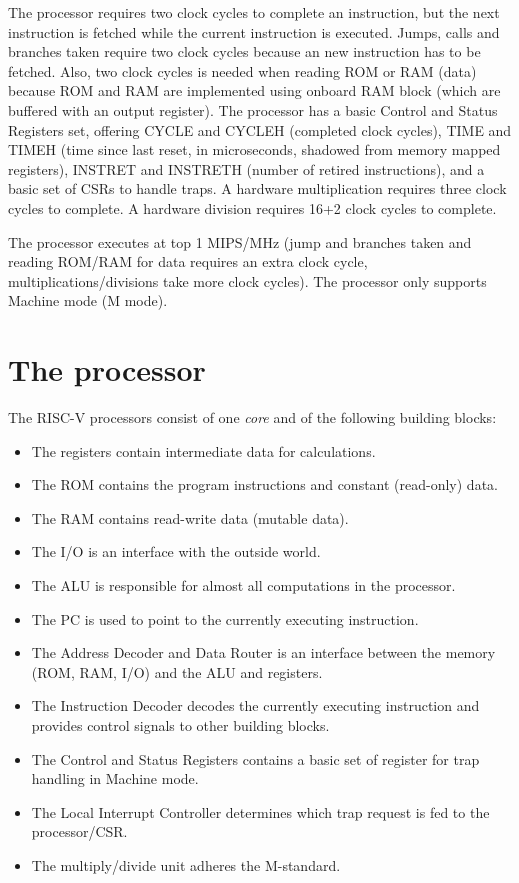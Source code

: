 \documentclass[12pt]{article}
\begin{document}
The processor requires two clock cycles to complete an instruction, but the next instruction is fetched while the current instruction is executed. Jumps, calls and branches taken require two clock cycles because an new instruction has to be fetched. Also, two clock cycles is needed when reading ROM or RAM (data) because ROM and RAM are implemented using onboard RAM block (which are buffered with an output register). The processor has a basic Control and Status Registers set, offering CYCLE and CYCLEH (completed clock cycles), TIME and TIMEH (time since last reset, in microseconds, shadowed from memory mapped registers), INSTRET and INSTRETH (number of retired instructions), and a basic set of CSRs to handle traps. A hardware multiplication requires three clock cycles to complete. A hardware division requires 16+2 clock cycles to complete.

The processor executes at top 1 MIPS/MHz (jump and branches taken and reading ROM/RAM for data requires an extra clock cycle, multiplications/divisions take more clock cycles). 
The processor only supports Machine mode (M mode).

\section{The processor}
The RISC-V processors consist of one \textit{core} and of the following building blocks:

\begin{itemize}
\item The registers contain intermediate data for calculations.
\item The ROM contains the program instructions and constant (read-only) data.
\item The RAM contains read-write data (mutable data).
\item The I/O is an interface with the outside world.
\item The ALU is responsible for almost all computations in the processor.
\item The PC is used to point to the currently executing instruction.
\item The Address Decoder and Data Router is an interface between the memory (ROM, RAM, I/O) and the ALU and registers.
\item The Instruction Decoder decodes the currently executing instruction and provides control signals to other building blocks.
\item The Control and Status Registers contains a basic set of register for trap handling in Machine mode.
\item The Local Interrupt Controller determines which trap request is fed to the processor/CSR.
\item The multiply/divide unit adheres the M-standard.
\end{itemize}
\end{document}
